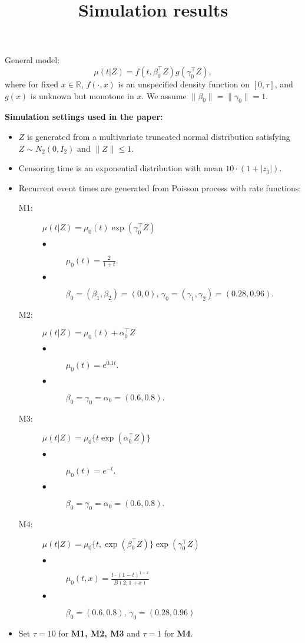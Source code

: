 \documentclass[a4paper,10pt]{article}
\title{Simulation results}
\author{}
\date{}
\begin{document}
\maketitle
\thispagestyle{empty} 
\pagestyle{empty}

\noindent
General model:
\begin{equation*}
\mu(t|Z) = f(t, \beta_0^\top Z)g(\gamma_0^\top Z),
\end{equation*}
where for fixed $x\in\mathbb{R}$,
$f(\cdot, x)$ is an unspecified density function on $[0, \tau]$, 
and $g(x)$ is unknown but monotone in $x$.
We assume $\|\beta_0\|=\|\gamma_0\|=1$.\newline

\textbf{Simulation settings used in the paper:} 
\begin{itemize}
\item $Z$ is generated from a multivariate truncated normal distribution 
satisfying $Z\sim N_2(0, I_2)$ and $\|Z\|\le1$.
\item Censoring time is an exponential distribution with mean $10\cdot(1 + |z_1|)$.
\item Recurrent event times are generated from Poisson process with rate functions:
\begin{description}
\item[M1:] $\mu(t|Z) = \mu_0(t) \exp(\gamma_0^\top Z)$
\begin{description}
\item[$\bullet$] $\mu_0(t) = \frac{2}{1 + t}$.
\item[$\bullet$] $\beta_0 = (\beta_1, \beta_2) = (0, 0)$, $\gamma_0 = (\gamma_1, \gamma_2) = (0.28, 0.96)$.
\end{description}
\item[M2:] $\mu(t|Z) = \mu_0(t) + \alpha_0^\top Z$
\begin{description}
\item[$\bullet$] $\mu_0(t) = e^{0.1t}$.
\item[$\bullet$] $\beta_0 = \gamma_0 = \alpha_0 = (0.6, 0.8)$.
\end{description}
\item[M3:] $\mu(t|Z) = \mu_0\{t\exp(\alpha_0^\top Z)\}$
\begin{description}
\item[$\bullet$] $\mu_0(t) = e^{-t}$.
\item[$\bullet$] $\beta_0 = \gamma_0 = \alpha_0 = (0.6, 0.8)$.
\end{description}
\item[M4:] $\mu(t|Z) = \mu_0\{t, \exp(\beta_0^\top Z)\}\exp(\gamma_0^\top Z)$
\begin{description}
\item[$\bullet$] $\mu_0(t, x) = \frac{t\cdot(1 - t)^{1+x}}{B(2, 1+x)}$
\item[$\bullet$] $\beta_0 = (0.6, 0.8)$, $\gamma_0 = (0.28, 0.96)$
\end{description}
\end{description}
\item Set $\tau = 10$ for \textbf{M1, M2, M3} and $\tau = 1$ for \textbf{M4}.

\end{itemize}
\end{document}
